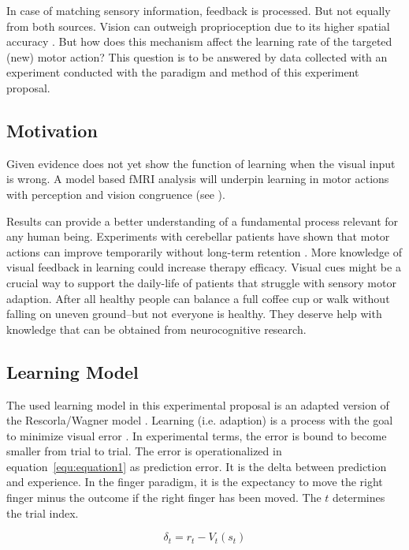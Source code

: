 \documentclass[man]{apa7}
\begin{document}
In case of matching sensory information, feedback is processed. But not equally from both sources. Vision can outweigh proprioception due to its higher spatial accuracy \parencite{Limanowski2016}. But how does this mechanism affect the learning rate of the targeted (new) motor action? This question is to be answered by data collected with an experiment conducted with the paradigm and method of this experiment proposal.

\subsection{Motivation}

Given evidence does not yet show the function of learning when the visual input is wrong. A model based fMRI analysis will underpin learning in motor actions with perception and vision congruence (see \cite{Limanowski2016}).

Results can provide a better understanding of a fundamental process relevant for any human being. Experiments with cerebellar patients have shown that motor actions can improve temporarily without long-term retention \parencite{seidler2013motor}. More knowledge of visual feedback in learning could increase therapy efficacy. Visual cues might be a crucial way to support the daily-life of patients that struggle with sensory motor adaption. After all healthy people can balance a full coffee cup or walk without falling on uneven ground–but not everyone is healthy. They deserve help with knowledge that can be obtained from neurocognitive research.


\subsection{Learning Model}

The used learning model in this experimental proposal is an adapted version of the Rescorla/Wagner model \parencite{Rescorla1972ATO}. Learning (i.e. adaption) is a process with the goal to minimize visual error \parencite{Tsay2022}. In experimental terms, the error is bound to become smaller from trial to trial. The error is operationalized in equation~\ref{equ:equation1} as prediction error. It is the delta between prediction and experience. In the finger paradigm, it is the expectancy to move the right finger minus the outcome if the right finger has been moved. The $t$ determines the trial index.

\begin{equation} \label{equation1}
\delta_t = r_t - V_t(s_t)
\label{equ:equation1}
\end{equation}
\end{document}
